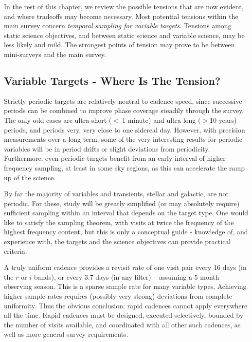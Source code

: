 In the rest of this chapter, we review the possible tensions that are
now evident, and where tradeoffs may become necessary. Most potential
tensions within the main survey concern {\it temporal sampling for
variable targets}.  Tensions among static science objectives, and
between static science and variable science, may be less likely and
mild. The strongest points of tension may prove to be between
mini-surveys and the main survey.



\subsection{Variable Targets - Where Is The Tension?}

Strictly periodic targets are relatively neutral to cadence speed, since
successive periods can be combined to improve phase coverage steadily
through the survey.  The only odd cases are ultra-short ($<~ $1 minute)
and ultra long ($> $10 years) periods, and periods very, very close to
one sidereal day.  However, with precision measurements over a long
term, some of the very interesting results for periodic variables will
be in period drifts or slight deviations from periodicity. Furthermore,
even periodic targets benefit from an early interval of higher frequency
sampling, at least in some sky regions, as this can accelerate the ramp
up of the science.

By far the majority of variables and transients, stellar and galactic,
are not periodic. For these, study will be greatly simplified (or may
absolutely require) sufficient sampling within an interval that depends
on the target type. One would like to satisfy the sampling theorem, with
visits at twice the frequency of the highest frequency content, but this
is only a conceptual guide - knowledge of, and experience with, the
targets and the science objectives can provide practical criteria.

A truly uniform cadence provides a revisit rate of one visit pair every
16 days (in the $r$ or $i$ bands), or every 3.7 days (in any filter) --
assuming a 5 month observing season.  This is a sparse sample rate for
many variable types.  Achieving higher sample rates requires (possibly
very strong) deviations from complete uniformity.  Thus the obvious
conclusion: rapid cadences cannot apply everywhere all the time. Rapid
cadences must be designed, executed selectively, bounded by the number
of visits available, and coordinated with all other such cadences, as
well as more general survey requirements.


